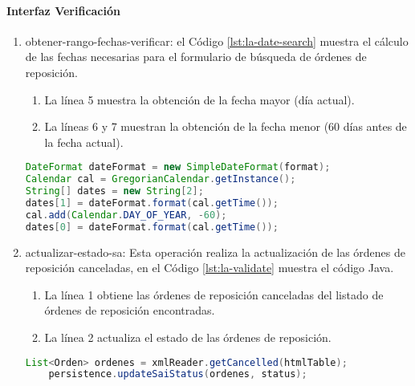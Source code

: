 \paragraph{\indent Interfaz Verificación}
\begin{enumerate}
	\item obtener-rango-fechas-verificar: el Código \ref{lst:la-date-search} muestra el cálculo de las fechas necesarias para el formulario de búsqueda de órdenes de reposición.
	\begin{enumerate}
		\item La línea 5 muestra la obtención de la fecha mayor (día actual).
		\item La líneas 6 y 7 muestran la obtención de la fecha menor (60 días antes de la fecha actual).
	\end{enumerate}
	\begin{lstlisting}[language=Java, caption={Cálculo del rango de fechas para buscar órdenes de reposición canceladas.}, captionpos=b, label={lst:la-date-search}]
DateFormat dateFormat = new SimpleDateFormat(format);
Calendar cal = GregorianCalendar.getInstance();
String[] dates = new String[2];
dates[1] = dateFormat.format(cal.getTime());
cal.add(Calendar.DAY_OF_YEAR, -60);
dates[0] = dateFormat.format(cal.getTime());
	\end{lstlisting}

	\item actualizar-estado-sa: Esta operación realiza la actualización de las órdenes de reposición canceladas, en el Código \ref{lst:la-validate} muestra el código Java.
	\begin{enumerate}
		\item La línea 1 obtiene las órdenes de reposición canceladas del listado de órdenes de reposición encontradas.
		\item La línea 2 actualiza el estado de las órdenes de reposición.
	\end{enumerate}
	\begin{lstlisting}[language=Java, caption={Actualización de órdenes de reposición canceladas.}, captionpos=b, label={lst:la-validate}]
	List<Orden> ordenes = xmlReader.getCancelled(htmlTable);
	persistence.updateSaiStatus(ordenes, status);
	\end{lstlisting}
\end{enumerate}


